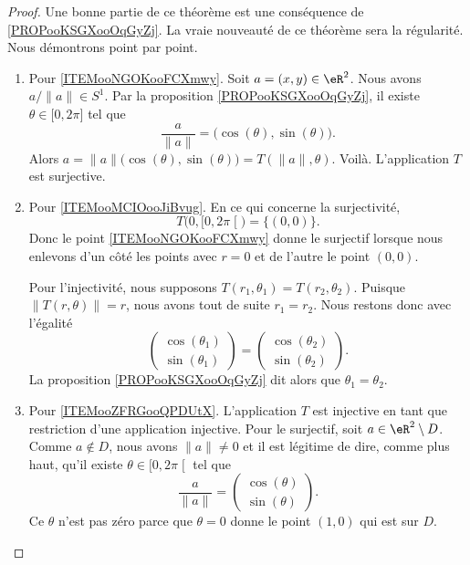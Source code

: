 \begin{proof}
	Une bonne partie de ce théorème est une conséquence de \ref{PROPooKSGXooOqGyZj}. La vraie nouveauté de ce théorème sera la régularité.  Nous démontrons point par point.
	\begin{enumerate}
		\item
		      Pour \ref{ITEMooNGOKooFCXmwy}. Soit \( a=(x,y)\in \eR^2\). Nous avons \( a/\| a \|\in S^1\). Par la proposition \ref{PROPooKSGXooOqGyZj}, il existe \( \theta\in \mathopen[ 0 , 2\pi \mathclose]\) tel que
		      \begin{equation}
			      \frac{ a }{ \| a \| }=\big( \cos(\theta),\sin(\theta) \big).
		      \end{equation}
		      Alors \( a=  \| a \|\big( \cos(\theta),\sin(\theta) \big)= T(\| a \|,\theta)\). Voilà. L'application \( T\) est surjective.
		\item
		      Pour \ref{ITEMooMCIOooJiBvug}. En ce qui concerne la surjectivité,
		      \begin{equation}
			      T\big( 0,\mathopen[ 0 , 2\pi \mathclose[ \big)=\{ (0,0) \}.
		      \end{equation}
		      Donc le point \ref{ITEMooNGOKooFCXmwy} donne le surjectif lorsque nous enlevons d'un côté les points avec \( r=0\) et de l'autre le point \( (0,0)\).

		      Pour l'injectivité, nous supposons \( T(r_1,\theta_1)=T(r_2,\theta_2)\). Puisque \( \| T(r,\theta) \|=r\), nous avons tout de suite \( r_1=r_2\). Nous restons donc avec l'égalité
		      \begin{equation}
			      \begin{pmatrix}
				      \cos(\theta_1) \\
				      \sin(\theta_1)
			      \end{pmatrix}=\begin{pmatrix}
				      \cos(\theta_2) \\
				      \sin(\theta_2)
			      \end{pmatrix}.
		      \end{equation}
		      La proposition \ref{PROPooKSGXooOqGyZj} dit alors que \( \theta_1=\theta_2\).
		\item
		      Pour \ref{ITEMooZFRGooQPDUtX}. L'application \( T\) est injective en tant que restriction d'une application injective. Pour le surjectif, soit \( a\in \eR^2\setminus D\). Comme \( a\notin D\), nous avons \( \| a \|\neq 0\) et il est légitime de dire, comme plus haut, qu'il existe \( \theta\in \mathopen[ 0 , 2\pi \mathclose[\) tel que
		      \begin{equation}
			      \frac{ a }{ \| a \| }=\begin{pmatrix}
				      \cos(\theta) \\
				      \sin(\theta)
			      \end{pmatrix}.
		      \end{equation}
		      Ce \( \theta\) n'est pas zéro parce que \( \theta=0\) donne le point \( (1,0)\) qui est sur \( D\).


\end{enumerate}
\end{proof}
